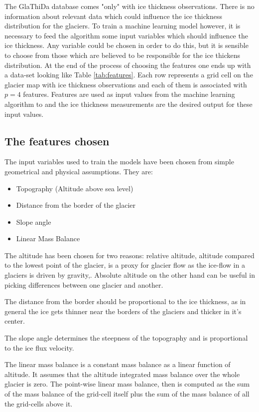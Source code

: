The GlaThiDa database comes "only" with ice thickness observations. There is no information about relevant data which could influence the ice thickness distribution for the glaciers. To train a machine learning model however, it is necessary to feed the algorithm some input variables which should influence the ice thickness. Any variable could be chosen in order to do this, but it is sensible to choose from those which are believed to be responsible for the ice thickens distribution. At the end of the process of choosing the features one ends up with a data-set looking like Table \ref{tab:features}. Each row represents a grid cell on the glacier map with ice thickness observations and each of them is associated with $p = 4$ features. Features are used as input values from the machine learning algorithm to and the ice thickness measurements are the desired output for these input values. 


\subsection{The features chosen}\label{features-chosen}
The input variables used to train the models have been chosen from simple geometrical and physical assumptions. They are:

\begin{itemize}
	\item Topography (Altitude above sea level)
	\item Distance from the border of the glacier
	\item Slope angle
	\item Linear Mass Balance
\end{itemize}
The altitude has been chosen for two reasons: relative altitude, altitude compared to the lowest point of the glacier, is a proxy for glacier flow as the ice-flow in a glaciers is driven by gravity,. Absolute altitude on the other hand can be useful in picking differences between one glacier and another.

The distance from the border should be proportional to the ice thickness, as in general the ice gets thinner near the borders of the glaciers and thicker in it's center. 

The slope angle determines the steepness of the topography and is proportional to the ice flux velocity.

The linear mass balance is a constant mass balance as a linear function of altitude. It assumes that the altitude integrated mass balance over the whole glacier is zero. The point-wise linear mass balance, then is computed as the sum of the mass balance of the grid-cell itself plus the sum of the mass balance of all the grid-cells above it. 
  
